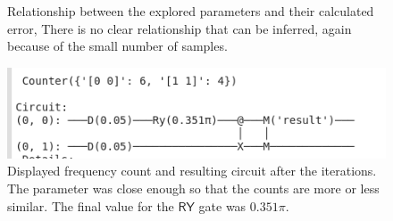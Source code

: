 \documentclass[11pt]{article}
\begin{document}
\begin{figure}[h!]
\caption{Relationship between the explored parameters and their calculated error, There is no clear relationship that can be inferred, again because of the small number of samples.}
\vspace{10pt}
\includegraphics[scale=0.5]{result10}
\caption{Displayed frequency count and resulting circuit after the iterations. The parameter was close enough so that the counts are more or less similar. The final value for the $\textsf{RY}$ gate was $0.351 \pi$.}
\end{figure}
\end{document}
